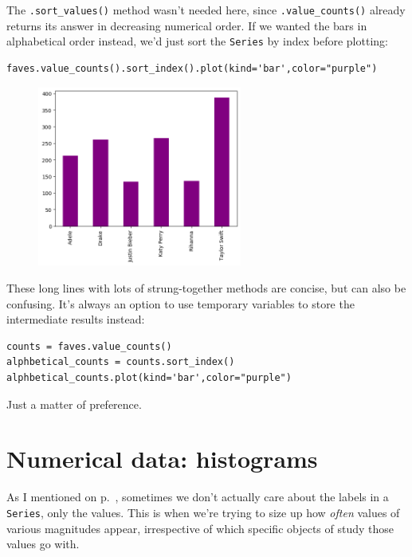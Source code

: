 
The \texttt{.sort\_values()} method wasn't needed here, since
\texttt{.value\_counts()} already returns its answer in decreasing numerical
order. If we wanted the bars in alphabetical order instead, we'd just sort the
\texttt{Series} by index before plotting:

\begin{Verbatim}[fontsize=\small,samepage=true,frame=single,framesep=3mm]
faves.value_counts().sort_index().plot(kind='bar',color="purple")
\end{Verbatim}

\begin{figure}[ht]
\centering
\includegraphics[width=0.6\textwidth]{celebs2.png}
\end{figure}

These long lines with lots of strung-together methods are concise, but can also
be confusing. It's always an option to use temporary variables to store the
intermediate results instead:

\begin{Verbatim}[fontsize=\small,samepage=true,frame=single,framesep=3mm]
counts = faves.value_counts()
alphbetical_counts = counts.sort_index()
alphbetical_counts.plot(kind='bar',color="purple")
\end{Verbatim}

Just a matter of preference.

\section{Numerical data: histograms}


As I mentioned on p.~\pageref{twoWaysToPlotUnivariateData}, sometimes we don't
actually care about the labels in a \texttt{Series}, only the values. This is
when we're trying to size up how \textit{often} values of various magnitudes
appear, irrespective of which specific objects of study those values go with.

